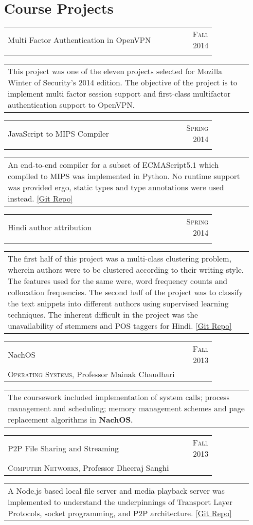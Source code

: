 \documentclass[a4paper,10pt]{article} %
\newcommand{\project}[4]{
    \begin{tabular}{p{0.85\linewidth}r}
        \textcolor{NavyBlue}{#2} & \multicolumn{1}{m{3cm}}{\raggedleft \textsc{#1}}\\
        #3
    \end{tabular}
    \begin{tabular}{p{\linewidth}}
        \footnotesize{#4}
    \end{tabular}
    \vspace{-0.1cm}
}
\begin{document}
\section{Course Projects}

\project {Fall 2014}
         {Multi Factor Authentication in OpenVPN}
         {\textsc{\raggedright Mozilla Winter of Security}, Guillaume Destuynder and Professor Dheeraj Sanghi}
         {This project was one of the eleven projects selected for Mozilla Winter of Security's 2014 edition.
          The objective of the project is to implement multi factor session
          support and first-class multifactor authentication support to
          OpenVPN.}

\project {Spring 2014}
         {JavaScript to MIPS Compiler}
         {\textsc{\raggedright Compilers}, Professor Subhajit Roy}
         {An end-to-end compiler for a subset of ECMAScript5.1 which compiled to MIPS was implemented in Python.
          No runtime support was provided ergo, static types and type annotations were used instead.
          \href{https://github.com/srijanshetty/javascript-compiler} {[Git Repo]}}

\project {Spring 2014}
         {Hindi author attribution}
         {\textsc{\raggedright Artificial Intelligence}, Professor Amitabha
          Mukherjee}
         {The first half of this project was a multi-class clustering problem,
          wherein authors were to be clustered according to their writing style.
          The features used for the same were, word frequency counts and collocation
          frequencies.  The second half of the project was to classify the text snippets
          into different authors using supervised learning techniques.
          The inherent difficult in the project was the unavailability of stemmers and POS taggers for Hindi.
          \href{https://github.com/srijanshetty/author-attribution} {[Git Repo]}}

\project {Fall 2013}
         {NachOS}
         {\textsc{Operating Systems}, Professor Mainak Chaudhari}
         {The coursework included implementation of system calls; process
          management and scheduling; memory management schemes and page replacement
          algorithms in \textbf{NachOS}.}

\project {Fall 2013}
         {P2P File Sharing and Streaming}
         {\textsc{Computer Networks}, Professor Dheeraj Sanghi}
         {A Node.js based local file server and media playback server was implemented
          to understand the underpinnings of Transport Layer Protocols, socket programming,
          and P2P architecture.  \href{https://github.com/srijanshetty/nodesock} {[Git Repo]}}
\end{document}
